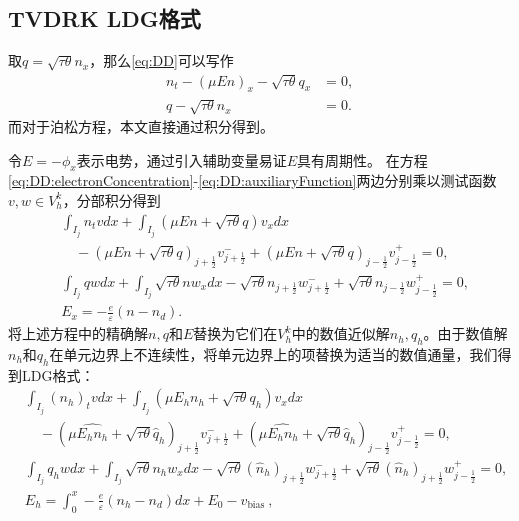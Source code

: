 \subsection{TVDRK LDG格式}
取$q = \sqrt{\tau \theta }n_x$，那么\autoref{eq:DD}可以写作
\begin{align}
	n_t - (\mu E n)_x - \sqrt{\tau \theta}q_x & = 0, \label{eq:DD:electronConcentration} \\
	q - \sqrt{\tau \theta}n_x                 & = 0. \label{eq:DD:auxiliaryFunction}
\end{align}
而对于泊松方程，本文直接通过积分得到。

令$E = -\phi_x$表示电势，通过引入辅助变量易证$E$具有周期性\cite{liu2010error}。
在方程\eqref{eq:DD:electronConcentration}-\eqref{eq:DD:auxiliaryFunction}两边分别乘以测试函数$v,w\in V_h^k$，分部积分得到
\begin{align}
	 & \int_{I_{j}} n_{t} v d x+\int_{I_{j}}(\mu E n+\sqrt{\tau \theta} q) v_{x} d x                                                                               \nonumber                                      \\
	 & \quad-(\mu E n+\sqrt{\tau \theta} q)_{j+\frac{1}{2}} v_{j+\frac{1}{2}}^{-}+(\mu E n+\sqrt{\tau \theta} q)_{j-\frac{1}{2}} v_{j-\frac{1}{2}}^{+}=0,            \label{eq:LDG:n}                             \\
	 & \int_{I_{j}} q w d x+\int_{I_{j}} \sqrt{\tau \theta} n w_{x} d x-\sqrt{\tau \theta} n_{j+\frac{1}{2}} w_{j+\frac{1}{2}}^{-}+\sqrt{\tau \theta} n_{j-\frac{1}{2}} w_{j-\frac{1}{2}}^{+}=0, \label{eq:LDG:q} \\
	 & E_{x}=-\frac{e}{\varepsilon}\left(n-n_{d}\right) .
\end{align}
将上述方程中的精确解$n, q$和$E$替换为它们在$V_{h}^{k}$中的数值近似解$n_h, q_h$。由于数值解$n_h$和$q_h$在单元边界上不连续性，将单元边界上的项替换为适当的数值通量，我们得到LDG格式：
\begin{align}
	 & \int_{I_{j}}\left(n_h\right)_{t} v d x+\int_{I_{j}}\left(\mu E_h n_h+\sqrt{\tau \theta} q_h\right) v_{x} d x      \nonumber                                                                                                                    \\
	 & \quad-\left(\mu \widehat{E_h n_h}+\sqrt{\tau \theta} \hat{q}_{h}\right)_{j+\frac{1}{2}} v_{j+\frac{1}{2}}^{-}+\left(\mu \widehat{E_h n_h}+\sqrt{\tau \theta} \hat{q}_{h}\right)_{j-\frac{1}{2}} v_{j-\frac{1}{2}}^{+}=0, \label{eq:DDLDGn}     \\
	 & \int_{I_{j}} q_h w d x+\int_{I_{j}} \sqrt{\tau \theta} n_h w_{x} d x-\sqrt{\tau \theta} (\hat{n}_h)_{j+\frac{1}{2}} w_{j+\frac{1}{2}}^{-}+\sqrt{\tau \theta} (\hat{n}_h)_{j+\frac{1}{2}} w_{j-\frac{1}{2}}^{+}=0,            \label{eq:DDLDGq} \\
	 & E_h=\int_{0}^{x}-\frac{e}{\varepsilon}\left(n_h-n_{d}\right) d x+E_{0}-v_{\text {bias }},\label{eq:DDLDGE}
\end{align}
